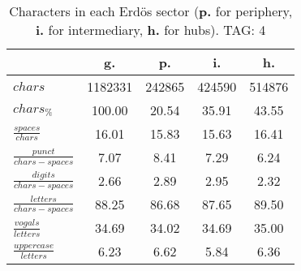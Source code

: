 \begin{table}[h!]
\begin{center}
\begin{tabular}{| l || c | c | c | c |}\hline
 & {\bf g.} & {\bf p.} & {\bf i.} & {\bf h.} \\\hline\hline
$chars$ & 1182331  & 242865  & 424590  & 514876 \\
$chars_{\%}$ & 100.00  & 20.54  & 35.91  & 43.55 \\\hline
$\frac{spaces}{chars}$ & 16.01  & 15.83  & 15.63  & 16.41 \\
$\frac{punct}{chars-spaces}$ & 7.07  & 8.41  & 7.29  & 6.24 \\
$\frac{digits}{chars-spaces}$ & 2.66  & 2.89  & 2.95  & 2.32 \\\hline
$\frac{letters}{chars-spaces}$ & 88.25  & 86.68  & 87.65  & 89.50 \\
$\frac{vogals}{letters}$ & 34.69  & 34.02  & 34.69  & 35.00 \\
$\frac{uppercase}{letters}$ & 6.23  & 6.62  & 5.84  & 6.36 \\\hline
\end{tabular}
\caption{Characters in each Erd\"os sector ({{\bf p.}} for periphery, {{\bf i.}} for intermediary, 
    {{\bf h.}} for hubs). TAG: 4}
\end{center}
\end{table}